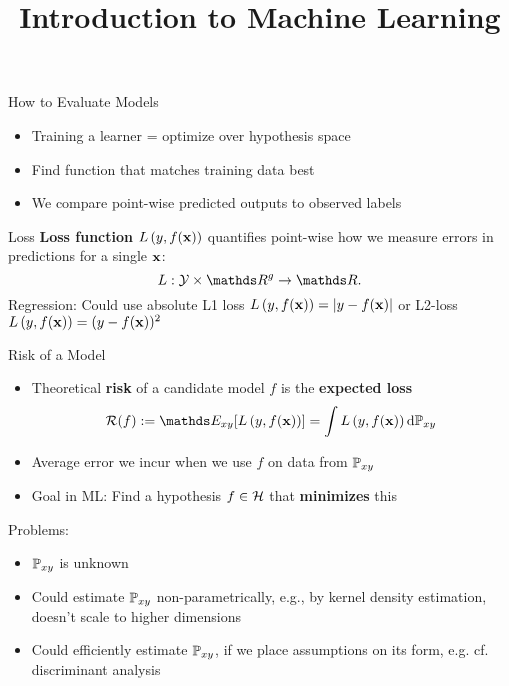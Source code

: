 \documentclass[11pt,compress,t,notes=noshow, xcolor=table]{beamer}
\title{Introduction to Machine Learning}
\begin{document}


\begin{frame}{How to Evaluate Models}
\begin{itemize}
\item Training a learner = optimize over hypothesis space
\item Find function that matches training data best
\item We compare point-wise predicted outputs to 
observed labels
\end{itemize}
\vfill
{} %
\end{frame}


\begin{frame}{Loss}
\textbf{Loss function} $L\left(y, f(\mathbf{x})\right)$ quantifies point-wise how we measure errors in predictions for a single $\mathbf{x}$:
$$
L: \Yspace \times \R^g \to \R.
$$
Regression: Could use absolute L1 loss  $L\left(y, f(\mathbf{x})\right) = |y-f(\mathbf{x})|$
or L2-loss $L\left(y, f(\mathbf{x})\right) = (y - f(\mathbf{x}))^2$
\end{frame}


\begin{frame}{Risk of a Model}
\begin{itemize}
  \item Theoretical \textbf{risk} of a candidate model $f$ is the \textbf{expected loss}
  $$ \riskf := \E_{xy} [\Lxy] = \int \Lxy \text{d}\Pxy $$
  \item Average error we incur when we use $f$ on data from $\mathbb{P}_{xy}$
  \item Goal in ML: Find a hypothesis $f \in \mathcal{H}$ that \textbf{minimizes} this
\end{itemize}
\vfill
Problems:
\begin{itemize}
\item $\mathbb{P}_{xy}$ is unknown
\item Could estimate $\mathbb{P}_{xy}$ non-parametrically, e.g., by kernel density estimation,  doesn't scale to higher dimensions
\item Could efficiently estimate $\mathbb{P}_{xy}$, if we place assumptions on its form, e.g. cf. discriminant analysis
\end{itemize}
\end{frame}
\end{document}
